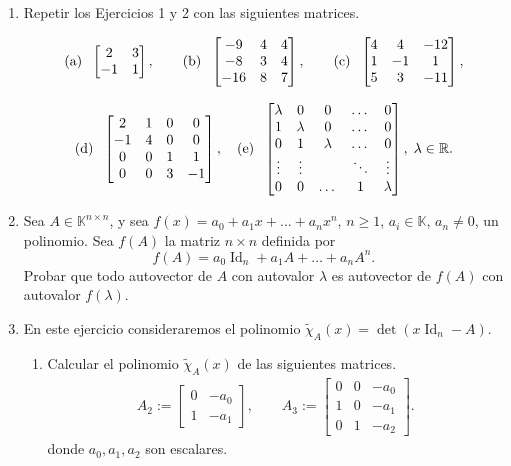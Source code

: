 \begin{enumerate}[resume,topsep=6pt,itemsep=.4cm]

\item\label{mas} Repetir los Ejercicios 1 y 2 con las siguientes matrices.

$$\textrm{(a)\; }\begin{bmatrix} 2 & 3 \\ -1 & 1
\end{bmatrix}, \qquad
\textrm{(b)\; }\begin{bmatrix} -9 & 4 & 4 \\ -8 & 3 & 4 \\ -16 & 8 & 7 \end{bmatrix}, \qquad \textrm{(c)\; } \left[\begin{matrix}4 & 4 & -12\\ 1 & -1 & 1\\ 5 & 3 & -11 \end{matrix} \right],$$

$$
\textrm{(d)\; } \left[\begin{matrix}2 & 1 & 0 & 0\\ -1 & 4 & 0 & 0\\ 0 & 0 & 1 & 1 \\ 0 & 0 & 3 & -1\end{matrix} \right],
\quad \textrm{(e)\; } \begin{bmatrix} \lambda & 0 & 0 & \dots & 0  \\ 1 & \lambda & 0 &\dots & 0  \\ 0 & 1 & \lambda&  \dots & 0  \\ \vdots & \vdots & \quad & \ddots & \vdots\\ 0 &  0&   \dots & 1  & \lambda \end{bmatrix}, \; \lambda\in \mathbb R.
$$


\item Sea $A\in\mathbb{K}^{n\times n}$, y sea $f(x) = a_0 + a_1 x + \dots + a_nx^n$, $n \geq 1$, $a_i\in\mathbb{K}$, $a_n \neq 0$, un polinomio. Sea $f(A)$ la matriz $n \times n$ definida por
$$f(A) = a_0 \operatorname{Id}_n + a_1 A + \dots + a_n A^n.$$
Probar que todo autovector de $A$ con autovalor $\lambda$ es autovector de $f(A)$ con autovalor $f(\lambda)$.


\item\label{caracteristico-otro} {En este ejercicio consideraremos el polinomio $\tilde\chi_A(x)=\det(x\operatorname{Id}_n-A)$.}

\begin{enumerate}
\item  Calcular el polinomio $\tilde\chi_A(x)$ de las siguientes matrices.
\begin{align*}
A_2 := \begin{bmatrix} 0 & -a_0 \\ 1 & -a_1
\end{bmatrix},\quad\quad
A_3 := \begin{bmatrix} 0 & 0 & -a_0 \\ 1 & 0 & -a_1 \\ 0 & 1 & -a_2
\end{bmatrix}.
\end{align*}
donde $a_0, a_1, a_2$ son escalares.


\end{enumerate}
\end{enumerate}
